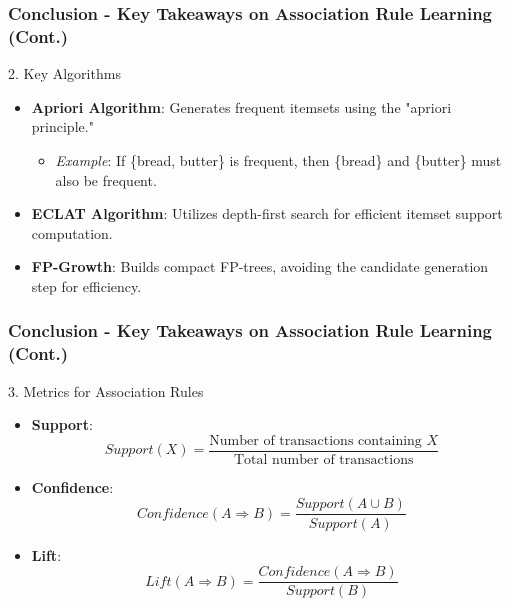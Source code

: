 \documentclass[aspectratio=169]{beamer}
\begin{document}
\begin{frame}[fragile]
    \frametitle{Conclusion - Key Takeaways on Association Rule Learning (Cont.)}
    
    \begin{block}{2. Key Algorithms}
        \begin{itemize}
            \item \textbf{Apriori Algorithm}: Generates frequent itemsets using the "apriori principle."
                \begin{itemize}
                    \item \textit{Example}: If \{bread, butter\} is frequent, then \{bread\} and \{butter\} must also be frequent.
                \end{itemize}
            \item \textbf{ECLAT Algorithm}: Utilizes depth-first search for efficient itemset support computation.
            \item \textbf{FP-Growth}: Builds compact FP-trees, avoiding the candidate generation step for efficiency.
        \end{itemize}
    \end{block}
\end{frame}

\begin{frame}[fragile]
    \frametitle{Conclusion - Key Takeaways on Association Rule Learning (Cont.)}

    \begin{block}{3. Metrics for Association Rules}
        \begin{itemize}
            \item \textbf{Support}:
                \begin{equation}
                Support(X) = \frac{\text{Number of transactions containing } X}{\text{Total number of transactions}}
                \end{equation}
            \item \textbf{Confidence}:
                \begin{equation}
                Confidence(A \Rightarrow B) = \frac{Support(A \cup B)}{Support(A)}
                \end{equation}
            \item \textbf{Lift}:
                \begin{equation}
                Lift(A \Rightarrow B) = \frac{Confidence(A \Rightarrow B)}{Support(B)}
                \end{equation}
        \end{itemize}
    \end{block}
\end{frame}
\end{document}
